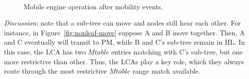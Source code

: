 \begin{figure}[!t]
\begin{center}
    \, 
    
    \caption{Mobile engine operation after mobility events.}
    \label{fig:movement-cases}
\end{center}
\end{figure}

\textit{Discussion:} note that a sub-tree can move and nodes still hear each other. For instance, in Figure~\ref{fig:nonleaf-move} suppose A and B move together. Then, A and C eventually will transit to PM, while B and C's sub-tree remain in HL. In this case, the LCA has two $Mtable$ entries matching with C's sub-tree, but one more restrictive than other. Thus, the LCAs play a key role, which they always route through the most restrictive $Mtable$ range match available. 

